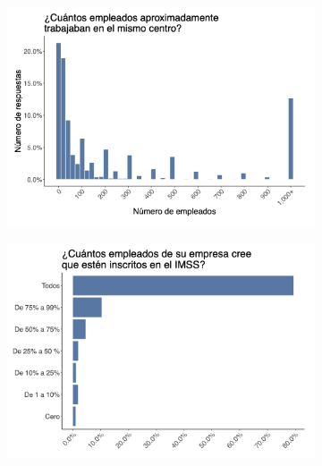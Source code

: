 \documentclass[oneside,11pt]{article}
\begin{document}
\begin{figure}[H]
\begin{center}
    \begin{subfigure}{0.49\textwidth}
    \includegraphics[width=\textwidth]{04_Figures/workey_survey/Exp_11.png}
    \end{subfigure}
    \begin{subfigure}{0.49\textwidth}
    \includegraphics[width=\textwidth]{04_Figures/workey_survey/Exp_12.png}
    \end{subfigure}
    
    \end{center}
\end{figure}

\clearpage
\end{document}
